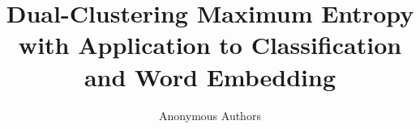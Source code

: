 \documentclass[letterpaper]{article}
\newcommand{\DCME}{Dual-Clustering Maximum Entropy}
\begin{document}
\title{\DCME{} \\ with Application to Classification and Word Embedding}
\author{
  Anonymous Authors
}

\maketitle







\newpage


\end{document}
